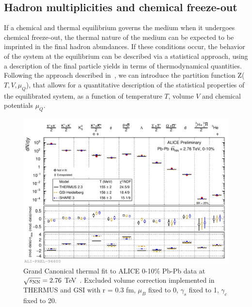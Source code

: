 \subsection{Hadron multiplicities and chemical freeze-out}
If a chemical and thermal equilibrium governs the medium when it
 undergoes chemical freeze-out, the thermal nature of the medium 
 can be expected to be imprinted in the final hadron abundances. 
 If these conditions occur, the behavior of the system at the 
 equilibrium can be described via a statistical approach, using a description 
 of the final particle yields in terms of thermodynamical quantities. 
 Following the approach described in~\cite{BraunMunzinger:2003zd}, 
 we can introduce the partition function Z($T,V,\mu_{Q}$), that 
 allows for a quantitative description of the statistical properties 
 of the equilibrated system, as a function of temperature $T$, 
 volume $V$ and chemical potentials $\mu_{Q}$. 
\begin{figure}[!ht]
  \centering
  \includegraphics[width=12cm]{FigCap1/GCThermalFit_PbPb010.pdf}
  \caption{Grand Canonical thermal fit to ALICE 0-10\% Pb-Pb data at $\sqrt{s_{\rm NN}} = 2.76$ TeV~\cite{Floris:2014pta}. Excluded volume correction implemented in THERMUS and GSI with r = 0.3 fm, $\mu_{B}$ fixed to 0, $\gamma_{s}$ fixed to 1, $\gamma_{c}$ fixed to 20. }
  \label{fig:GCThermalFit_PbPb010}
\end{figure}

